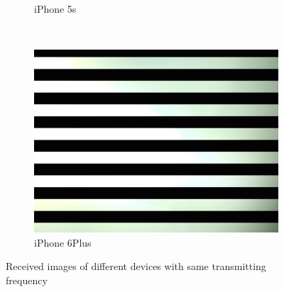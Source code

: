 \begin{figure}[!t]
\begin{subfigure}[h]{0.12\textwidth}
  \caption{iPhone 5s}
  \end{subfigure}
  ~ 
  \begin{subfigure}[h]{0.12\textwidth}
  \includegraphics[width=\textwidth]{pic/6plus.JPG}
  \caption{iPhone 6Plus}
  \end{subfigure}
\caption{Received images of different devices with same transmitting frequency}
\label{fig:freq_strip_iphones}
\end{figure}
